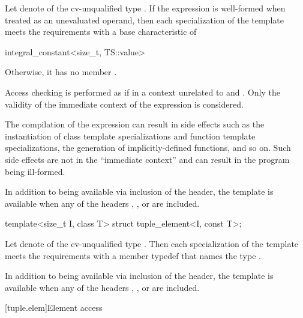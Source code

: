 \begin{itemdescr}
\pnum
Let  denote  of the cv-unqualified type .
If the expression  is well-formed
when treated as an unevaluated operand, then
each specialization of the template meets the  requirements
with a base characteristic of
\begin{codeblock}
integral_constant<size_t, TS::value>
\end{codeblock}
Otherwise, it has no member .

\pnum
Access checking is performed as if in a context
unrelated to  and .
Only the validity of the immediate context of the expression is considered.
\begin{note}
The compilation of the expression can result in side effects
such as the instantiation of class template specializations and
function template specializations, the generation of implicitly-defined functions, and so on.
Such side effects are not in the ``immediate context'' and
can result in the program being ill-formed.
\end{note}

\pnum
In addition to being available via inclusion of the  header,
the template is available
when any of the headers
,
, or
are included.
\end{itemdescr}

%
\begin{itemdecl}
template<size_t I, class T> struct tuple_element<I, const T>;
\end{itemdecl}

\begin{itemdescr}
\pnum
Let  denote  of the cv-unqualified type . Then
each specialization of the template meets the  requirements
with a member typedef  that names the type .

\pnum
In addition to being available via inclusion of the  header,
the template is available
when any of the headers
,
, or
are included.
\end{itemdescr}

[tuple.elem]{Element access}

